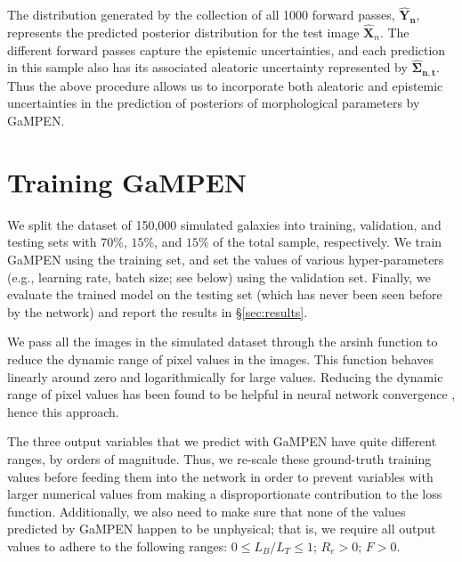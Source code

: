\documentclass[twocolumn]{aastex63}
\newcommand\gampen{GaMPEN}
\begin{document}
\begin{CJK*}{UTF8}{gbsn}
The distribution generated by the collection of all 1000 forward passes, $\boldsymbol{\hat{Y}_{n}}$,
represents the predicted posterior distribution for the test image $\boldsymbol{\hat{X}}_n$. The different forward passes capture the epistemic uncertainties, and each prediction in this sample also has its associated aleatoric uncertainty represented by $\boldsymbol{\hat{\Sigma}_{n,t}}$. Thus the above procedure allows us to incorporate both aleatoric and epistemic uncertainties in the prediction of posteriors of morphological parameters by \gampen{}.

\section{Training \gampen } \label{sec:training}
We split the dataset of 150,000 simulated galaxies into training, validation, and testing sets with $70\%$, $15\%$, and $15\%$ of the total sample, respectively. We train \gampen{} using the training set, and set the values of various hyper-parameters (e.g., learning rate, batch size; see below) using the validation set. Finally, we evaluate the trained model on the testing set (which has never been seen before by the network) and report the results in \S \ref{sec:results}.

We pass all the images in the simulated dataset through the arsinh function to reduce the dynamic range of pixel values in the images. This function behaves linearly around zero and logarithmically for large values. Reducing the dynamic range of pixel values has been found to be helpful in neural network convergence \citep[e.g.,][]{zanisi_21,walmsley_decals,tanaka_22}, hence this approach. 

The three output variables that we predict with \gampen{} have quite different ranges, by orders of magnitude. Thus, we re-scale these ground-truth training values before feeding them into the network in order to prevent variables with larger numerical values from making a disproportionate contribution to the loss function. Additionally, we also need to make sure that none of the values predicted by \gampen{} happen to be unphysical; that is, we require all output values to adhere to the following ranges: $0 \leq L_B/L_T \leq 1$; $R_e > 0$; $F > 0$. 


\end{CJK*}
\end{document}

